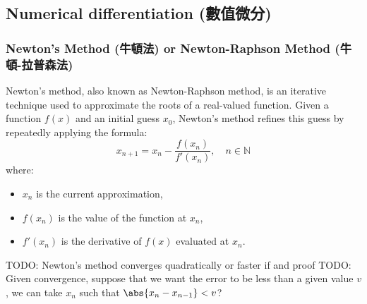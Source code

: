 \subsection{Numerical differentiation (數值微分)}
\subsubsection{Newton's Method (牛頓法) or Newton-Raphson Method (牛頓-拉普森法)}
Newton's method, also known as Newton-Raphson method, is an iterative technique used to approximate the roots of a real-valued function. Given a function $f(x)$ and an initial guess \( x_0 \), Newton's method refines this guess by repeatedly applying the formula:
\[
x_{n+1} = x_n - \frac{f(x_n)}{f'(x_n)},\quad n\in\mathbb{N}
\]
where:
\begin{itemize}
\item \( x_n \) is the current approximation,
\item \( f(x_n) \) is the value of the function at \( x_n \),
\item \( f'(x_n) \) is the derivative of \( f(x) \) evaluated at \( x_n \).
\end{itemize}
TODO: Newton's method converges quadratically or faster if and proof
TODO: Given convergence, suppose that we want the error to be less than a given value $v$, we can take $x_n$ such that $\abs{x_n-x_{n-1}}<v$?
